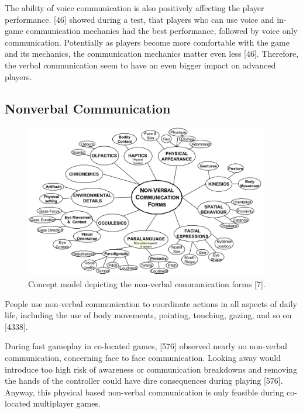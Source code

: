 The ability of voice communication is also positively affecting the player performance. \textcite{Vaddi2016Investigating2}[46] showed during a test, that players who can use voice and in-game communication mechanics had the best performance, followed by voice only communication. Potentially as players become more comfortable with the game and its mechanics, the communication mechanics matter even less \autocite{Vaddi2016Investigating2}[46]. Therefore, the verbal communication seem to have an even bigger impact on advanced players.




\subsection{Nonverbal Communication}
\label{section:Nonverbal Communication}

\begin{figure}
    \centering
    \includegraphics[width=0.95\textwidth]{images/non-verbal_communication_forms.png}
    \caption{ Concept model depicting the non-verbal communication forms
    \break
    \autocite{Manninen2002PlayerSession}[7]. }
    \label{fig:non-verbal communication forms}
\end{figure}

People use non-verbal communication to coordinate actions in all aspects of daily life, including the use of body movements, pointing, touching, gazing, and so on \autocite{Leavitt2016PingGames}[4338].

During fast gameplay in co-located games, \textcite{Cheung2012CommunicationGaming}[576] observed nearly no non-verbal communication, concerning face to face communication.
Looking away would introduce too high risk of awareness or communication breakdowns and removing the hands of the controller could have dire consequences during playing \autocite{Cheung2012CommunicationGaming}[576]. Anyway, this physical based non-verbal communication is only feasible during co-located multiplayer games.


